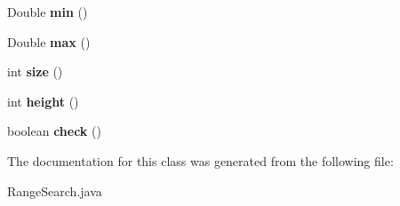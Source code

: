 \begin{DoxyCompactItemize}
\item 
\mbox{\label{classcom_1_1mycompany_1_1myfirstmapboxapp_1_1_range_search_a72ffa880d4d3c46bda8d222d087c9f51}} 
Double {\bfseries min} ()
\item 
\mbox{\label{classcom_1_1mycompany_1_1myfirstmapboxapp_1_1_range_search_a446592f43420cfbd171fa94024aa67b4}} 
Double {\bfseries max} ()
\item 
\mbox{\label{classcom_1_1mycompany_1_1myfirstmapboxapp_1_1_range_search_ab22787e409de78a3ef6fb0d447feef36}} 
int {\bfseries size} ()
\item 
\mbox{\label{classcom_1_1mycompany_1_1myfirstmapboxapp_1_1_range_search_a6cdc610008e387124ea5406f6912a6cb}} 
int {\bfseries height} ()
\item 
\mbox{\label{classcom_1_1mycompany_1_1myfirstmapboxapp_1_1_range_search_a03b4fffbbbb9a04b5fe40bbb05828184}} 
boolean {\bfseries check} ()
\end{DoxyCompactItemize}


The documentation for this class was generated from the following file\+:\begin{DoxyCompactItemize}
\item 
Range\+Search.\+java\end{DoxyCompactItemize}
